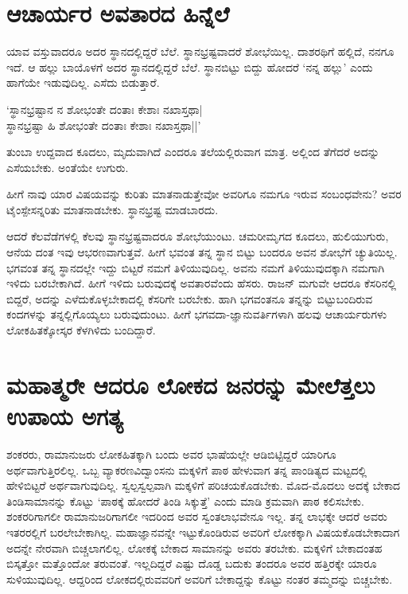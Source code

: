 \section*{ಆಚಾರ್ಯರ ಅವತಾರದ ಹಿನ್ನೆಲೆ}

ಯಾವ ವಸ್ತುವಾದರೂ ಅದರ ಸ್ಥಾನದಲ್ಲಿದ್ದರೆ ಬೆಲೆ. ಸ್ಥಾನಭ್ರಷ್ಟವಾದರೆ ಶೋಭೆಯಿಲ್ಲ. ದಾಶರಥಿಗೆ ಹಲ್ಲಿದೆ, ನನಗೂ ಇದೆ. ಆ ಹಲ್ಲು ಬಾಯೊಳಗೆ ಅದರ ಸ್ಥಾನದಲ್ಲಿದ್ದರೆ ಬೆಲೆ. ಸ್ಥಾನಬಿಟ್ಟು ಬಿದ್ದು ಹೋದರೆ `ನನ್ನ ಹಲ್ಲು' ಎಂದು ಹಾಗೆಯೇ ಇಡುವುದಿಲ್ಲ. ಎಸೆದು ಬಿಡುತ್ತಾರೆ.

\begin{shloka}
`ಸ್ಥಾನಭ್ರಷ್ಟಾನ ನ ಶೋಭಂತೇ ದಂತಾಃ ಕೇಶಾಃ ನಖಾಸ್ತಥಾ|\label{48d}\\
ಸ್ಥಾನಭ್ರಷ್ಟಾ ಹಿ ಶೋಭಂತೇ ದಂತಾಃ ಕೇಶಾಃ ನಖಾಸ್ತಥಾ||'
\end{shloka}

ತುಂಬಾ ಉದ್ದವಾದ ಕೂದಲು, ಮೃದುವಾಗಿದೆ ಎಂದರೂ ತಲೆಯಲ್ಲಿರುವಾಗ ಮಾತ್ರ. ಅಲ್ಲಿಂದ ತೆಗೆದರೆ ಅದನ್ನು ಎಸೆಯಬೇಕು. ಅಂತೆಯೇ ಉಗುರು.

ಹೀಗೆ ನಾವು ಯಾರ ವಿಷಯವನ್ನು ಕುರಿತು ಮಾತನಾಡುತ್ತೇವೋ ಅವರಿಗೂ ನಮಗೂ ಇರುವ ಸಂಬಂಧವೇನು? ಅವರ ಟೈಂಸ್ಪೇಸನ್ನರಿತು ಮಾತನಾಡಬೇಕು. ಸ್ಥಾನಭ್ರಷ್ಟ ಮಾಡಬಾರದು.

ಆದರೆ ಕೆಲವೆಡೆಗಳಲ್ಲಿ ಕೆಲವು ಸ್ಥಾನಭ್ರಷ್ಟವಾದರೂ ಶೋಭೆಯುಂಟು. ಚಮರೀಮೃಗದ ಕೂದಲು, ಹುಲಿಯುಗುರು, ಆನೆಯ ದಂತ ಇವು ಆಭರಣವಾಗುತ್ತವೆ. ಹೀಗೆ ಭವಂತ ತನ್ನ ಸ್ಥಾನ ಬಿಟ್ಟು ಬಂದರೂ ಅವನ ಶೋಭೆಗೆ ಚ್ಯುತಿಯಿಲ್ಲ. ಭಗವಂತ ತನ್ನ ಸ್ಥಾನದಲ್ಲೇ ಇದ್ದು ಬಿಟ್ಟರೆ ನಮಗೆ ತಿಳಿಯುವುದಿಲ್ಲ. ಅವನು ನಮಗೆ ತಿಳಿಯುವುದಕ್ಕಾಗಿ ನಮಗಾಗಿ ಇಳಿದು ಬರಬೇಕಾಗಿದೆ. ಹೀಗೆ ಇಳಿದು ಬರುವುದಕ್ಕೆ  ಅವತಾರವೆಂದು ಹೆಸರು. ರಾಜನ್ ಮಗುವೇ ಆದರೂ ಕೆಸರಿನಲ್ಲಿ ಬಿದ್ದರೆ, ಅದನ್ನು ಎಳೆದುಕೊಳ್ಳಬೇಕಾದಲ್ಲಿ ಕೆಸರಿಗೇ ಬರಬೇಕು. ಹಾಗಿ ಭಗವಂತನೂ ತನ್ನನ್ನು ಬಿಟ್ಟುಬಂದಿರುವ ಕಂದಗಳನ್ನು ತನ್ನಲ್ಲಿಗೊಯ್ಯಲು ಬರುವುದುಂಟು. ಹೀಗೆ ಭಗವದಾ-ಜ್ಞಾನುವರ್ತಿಗಳಾಗಿ ಹಲವು ಆಚಾರ್ಯರುಗಳು ಲೋಕಹಿತಕ್ಕೋಸ್ಕರ ಕೆಳಗಿಳಿದು ಬಂದಿದ್ದಾರೆ. 

\section*{ಮಹಾತ್ಮರೇ ಆದರೂ ಲೋಕದ ಜನರನ್ನು ಮೇಲೆತ್ತಲು ಉಪಾಯ ಅಗತ್ಯ}

ಶಂಕರರು, ರಾಮಾನುಜರು ಲೋಕಹಿತಕ್ಕಾಗಿ ಬಂದು ಅವರ ಭಾಷೆಯಲ್ಲೇ ಆಡಿಬಿಟ್ಟಿದ್ದರೆ ಯಾರಿಗೂ ಅರ್ಥವಾಗುತ್ತಿರಲಿಲ್ಲ. ಒಬ್ಬ ವ್ಯಾಕರಣವಿದ್ವಾಂಸನು ಮಕ್ಕಳಿಗೆ ಪಾಠ ಹೇಳುವಾಗ ತನ್ನ ಪಾಂಡಿತ್ಯದ ಮಟ್ಟದಲ್ಲಿ ಹೇಳಿಬಿಟ್ಟರೆ ಅರ್ಥವಾಗುವುದಿಲ್ಲ. ಸ್ವಲ್ಪಸ್ವಲ್ಪವಾಗಿ ಮಕ್ಕಳಿಗೆ ಪರಿಚಯಕೊಡಬೇಕು. ಮೊದ-ಮೊದಲು ಅದಕ್ಕೆ ಬೇಕಾದ ತಿಂಡಿಸಾಮಾನನ್ನು ಕೊಟ್ಟು `ಪಾಠಕ್ಕೆ ಹೋದರೆ ತಿಂಡಿ ಸಿಕ್ಕುತ್ತೆ' ಎಂದು ಮಾಡಿ ಕ್ರಮವಾಗಿ ಪಾಠ ಕಲಿಸಬೇಕು. ಶಂಕರರಿಗಾಗಲೀ ರಾಮಾನುಜರಿಗಾಗಲೀ ಇದರಿಂದ ಅವರ ಸ್ವಂತಲಾಭವೇನೂ ಇಲ್ಲ. ತನ್ನ ಲಾಭಕ್ಕೇ ಆದರೆ ಅವರು ಇತರರಲ್ಲಿಗೆ ಬರಲೇಬೇಕಾಗಿಲ್ಲ. ಮಹಾಜ್ಞಾನವನ್ನೇ ಇಟ್ಟುಕೊಂಡಿರುವ ಅವರಿಗೆ ಲೋಕಕ್ಕಾಗಿ ವಿಷಯಕೊಡಬೇಕಾದಾಗ ಅದನ್ನೇ ನೇರವಾಗಿ ಬಿಚ್ಚಲಾಗಲಿಲ್ಲ. ಲೋಕಕ್ಕೆ ಬೇಕಾದ ಸಾಮಾನನ್ನು ಅವರು ತರಬೇಕು. ಮಕ್ಕಳಿಗೆ ಬೇಕಾದಂತಹ ಬಿಸ್ಕತ್ತೋ ಮತ್ತೊಂದೋ ತರುವಂತೆ. ಇಲ್ಲದಿದ್ದರೆ ಎಷ್ಟು  ದೊಡ್ಡ ಬದುಕು ತಂದರೂ ಅವರ ಹತ್ತಿರಕ್ಕೇ ಯಾರೂ ಸುಳಿಯುವುದಿಲ್ಲ. ಆದ್ದರಿಂದ ಲೋಕದಲ್ಲಿರುವವರಿಗೆ ಅವರಿಗೆ ಬೇಕಾದ್ದನ್ನು ಕೊಟ್ಟು ನಂತರ ತಮ್ಮದನ್ನು ಬಿಚ್ಚಬೇಕು.


